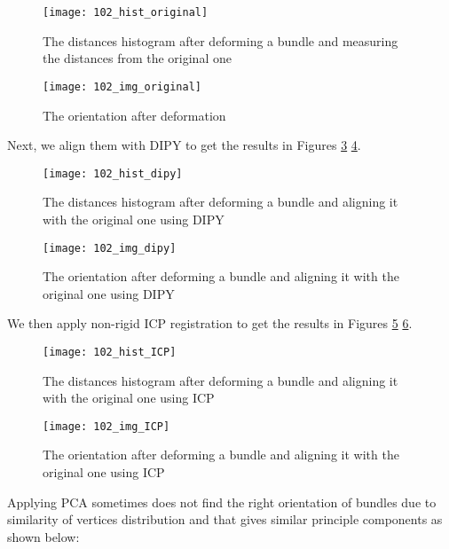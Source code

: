 \documentclass[../structure.tex]{subfiles}
\begin{document}
\begin{figure}[h!]
\centering
\texttt{[image: 102\_hist\_original]}
\captionsetup{justification=centering}
\caption{The distances histogram after deforming a bundle and measuring the distances from the original one}
\label{fig:hist_original_def}
\end{figure}

\begin{figure}[h!]
\centering
\texttt{[image: 102\_img\_original]}
\captionsetup{justification=centering}
\caption{The orientation after deformation}
\label{fig:img_original_def}
\end{figure}
\pagebreak

Next, we align them with DIPY to get the results in Figures \ref{fig:hist_dipy_def} \ref{fig:img_dipy_def}.

\begin{figure}[h!]
\centering
\texttt{[image: 102\_hist\_dipy]}
\captionsetup{justification=centering}
\caption{The distances histogram after deforming a bundle and aligning it with the original one using DIPY}
\label{fig:hist_dipy_def}
\end{figure}

\begin{figure}[h!]
\centering
\texttt{[image: 102\_img\_dipy]}
\captionsetup{justification=centering}
\caption{The orientation after deforming a bundle and aligning it with the original one using DIPY}
\label{fig:img_dipy_def}
\end{figure}
\pagebreak
We then apply non-rigid ICP registration to get the results in Figures \ref{fig:hist_icp_def} \ref{fig:img_icp_def}.

\begin{figure}[h!]
\centering
\texttt{[image: 102\_hist\_ICP]}
\captionsetup{justification=centering}
\caption{The distances histogram after deforming a bundle and aligning it with the original one using ICP}
\label{fig:hist_icp_def}
\end{figure}

\begin{figure}[h!]
\centering
\texttt{[image: 102\_img\_ICP]}
\captionsetup{justification=centering}
\caption{The orientation after deforming a bundle and aligning it with the original one using ICP}
\label{fig:img_icp_def}
\end{figure}

\pagebreak

Applying PCA sometimes does not find the right orientation of bundles due to similarity of vertices distribution and that gives similar principle components as shown below:
\end{document}
